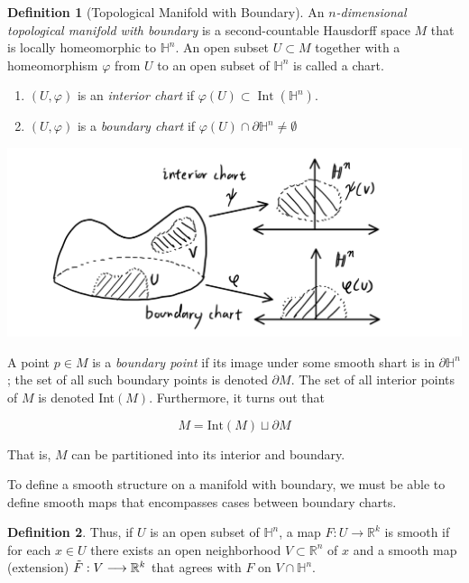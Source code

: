 \documentclass{article}
\DeclareMathOperator{\Int}{Int}
\theoremstyle{remark}
\theoremstyle{definition}
\newtheorem{definition}{Definition}[section]
\begin{document}
    \begin{definition}[Topological Manifold with Boundary]
      An \textit{$n$-dimensional topological manifold with boundary} is a second-countable Hausdorff space $M$ that is locally homeomorphic to $\mathbb{H}^n$. An open subset $U \subset M$ together with a homeomorphism $\varphi$ from $U$ to an open subset of $\mathbb{H}^n$ is called a chart.

      \begin{enumerate}
        \item $(U, \varphi)$ is an \textit{interior chart} if $\varphi(U) \subset \Int(\mathbb{H}^n)$. 
        \item $(U, \varphi)$ is a \textit{boundary chart} if $\varphi(U) \cap \partial \mathbb{H}^n \neq \emptyset$
      \end{enumerate}

      \begin{center}
        \includegraphics[scale=0.25]{img/Interior_Boundary_Chart.PNG}
      \end{center}

      A point $p \in M$ is a \textit{boundary point} if its image under some smooth shart is in $\partial \mathbb{H}^n$; the set of all such boundary points is denoted $\partial M$. The set of all interior points of $M$ is denoted Int$(M)$. Furthermore, it turns out that

        \[M = \text{Int}(M) \sqcup \partial M\]

      That is, $M$ can be partitioned into its interior and boundary. 
    \end{definition}

    To define a smooth structure on a manifold with boundary, we must be able to define smooth maps that encompasses cases between boundary charts. 

    \begin{definition}
      Thus, if $U$ is an open subset of $\mathbb{H}^n$, a map $F: U \longrightarrow \mathbb{R}^k$ is smooth if for each $x \in U$ there exists an open neighborhood $V \subset \mathbb{R}^n$ of $x$ and a smooth map (extension) $\Tilde{F}: V \longrightarrow \mathbb{R}^k$ that agrees with $F$ on $V \cap \mathbb{H}^n$. 
    \end{definition}
\end{document}
